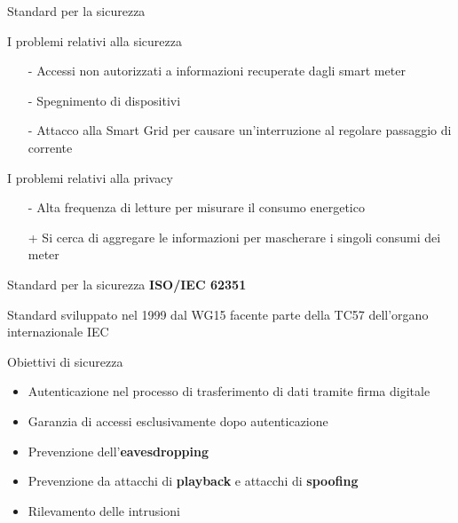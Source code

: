 \begin{frame}{Standard per la sicurezza}
	\begin{block}{I problemi relativi alla sicurezza}
	\begin{itemize}
		\item[-] Accessi non autorizzati a informazioni recuperate dagli smart meter
		\item[-] Spegnimento di dispositivi
		\item[-] Attacco alla Smart Grid per causare un'interruzione al regolare passaggio di corrente
	\end{itemize}
	\end{block}		
	\pause
	\begin{block}{I problemi relativi alla privacy}
	\begin{itemize}
		\item[-] Alta frequenza di letture per misurare il consumo energetico
		\item[+] Si cerca di aggregare le informazioni per mascherare i singoli consumi dei meter
	\end{itemize}
	\end{block}		
\end{frame}

\begin{frame}{Standard per la sicurezza}
\textbf{ISO/IEC 62351}
\begin{block}{}
Standard sviluppato nel 1999 dal WG15 facente parte della TC57 dell'organo internazionale IEC
\end{block}
\pause
\begin{block}{Obiettivi di sicurezza}
\begin{itemize}
	\item Autenticazione nel processo di trasferimento di dati tramite firma digitale
	\item Garanzia di accessi esclusivamente dopo autenticazione
	\item Prevenzione dell'\textbf{\color{blue_slides}eavesdropping}%
	\item Prevenzione da attacchi di \textbf{\color{blue_slides}playback} e attacchi di \textbf{\color{blue_slides}spoofing}
	\item Rilevamento delle intrusioni
\end{itemize}
\end{block}
\end{frame}


